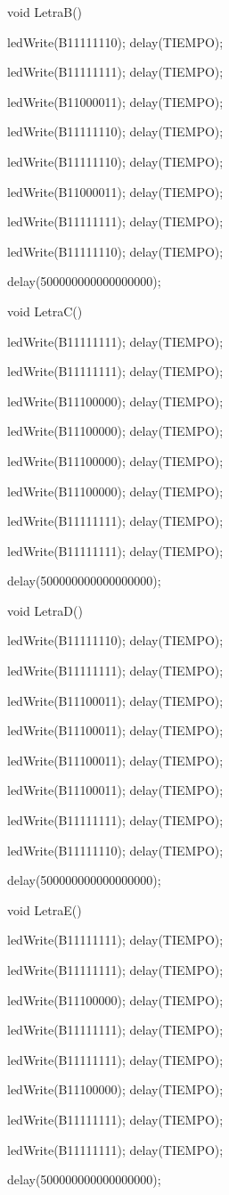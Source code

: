 \documentclass{article}
\begin{document}
void LetraB(){
     
   ledWrite(B11111110); delay(TIEMPO);
   
   ledWrite(B11111111); delay(TIEMPO);
   
   ledWrite(B11000011); delay(TIEMPO);
   
   ledWrite(B11111110); delay(TIEMPO);
   
   ledWrite(B11111110); delay(TIEMPO);
   
   ledWrite(B11000011); delay(TIEMPO);
   
   ledWrite(B11111111); delay(TIEMPO);
   
   ledWrite(B11111110); delay(TIEMPO);
  
  delay(500000000000000000);}

void LetraC(){
   
   ledWrite(B11111111); delay(TIEMPO);
   
   ledWrite(B11111111); delay(TIEMPO);
   
   ledWrite(B11100000); delay(TIEMPO);
   
   ledWrite(B11100000); delay(TIEMPO);
   
   ledWrite(B11100000); delay(TIEMPO);
   
   ledWrite(B11100000); delay(TIEMPO);
   
   ledWrite(B11111111); delay(TIEMPO);
   
   ledWrite(B11111111); delay(TIEMPO);
  
  delay(500000000000000000);}

void LetraD(){
   
   ledWrite(B11111110); delay(TIEMPO);
   
   ledWrite(B11111111); delay(TIEMPO);
   
   ledWrite(B11100011); delay(TIEMPO);
   
   ledWrite(B11100011); delay(TIEMPO);
   
   ledWrite(B11100011); delay(TIEMPO);
   
   ledWrite(B11100011); delay(TIEMPO);
   
   ledWrite(B11111111); delay(TIEMPO);
   
   ledWrite(B11111110); delay(TIEMPO);
   
   delay(500000000000000000);}

void LetraE(){
   
   ledWrite(B11111111); delay(TIEMPO);
   
   ledWrite(B11111111); delay(TIEMPO);
   
   ledWrite(B11100000); delay(TIEMPO);
   
   ledWrite(B11111111); delay(TIEMPO);
   
   ledWrite(B11111111); delay(TIEMPO);
   
   ledWrite(B11100000); delay(TIEMPO);
   
   ledWrite(B11111111); delay(TIEMPO);
   
   ledWrite(B11111111); delay(TIEMPO);
   
   delay(500000000000000000);}
\end{document}
